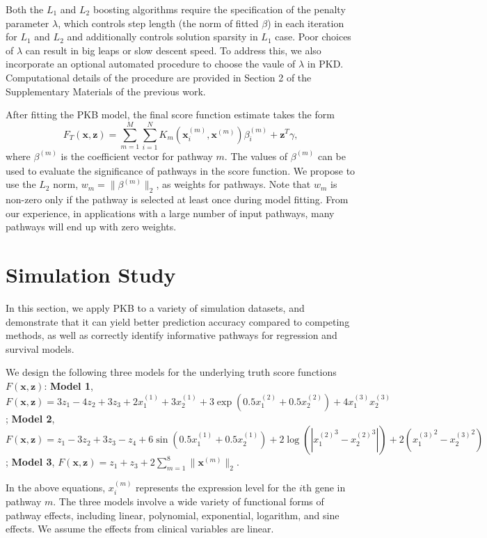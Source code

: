 \documentclass[a4paper,12pt]{article}
\newcommand{\bd}[1]{\mathbf{#1}}
\newcommand{\pathexpr}[3]{{#1}_{#2}^{(#3)}}
\begin{document}
Both the $L_1$ and $L_2$ boosting algorithms require the specification of the penalty parameter $\lambda$, which controls step length (the norm of fitted $\beta$) in each iteration for $L_1$ and $L_2$ and additionally controls solution sparsity in $L_1$ case. Poor choices of $\lambda$ can result in big leaps or slow descent speed. To address this, we also incorporate an optional automated procedure to choose the vaule of $\lambda$ in PKD. Computational details of the procedure are provided in Section 2 of the Supplementary Materials of the previous work.\cite{zeng2019pathway}

After fitting the PKB model, the final score function estimate takes the form
$$F_T(\bd{x}, \bd{z}) = \sum_{m=1}^M \sum_{i=1}^N K_m(\pathexpr{\bd{x}}{i}{m},\pathexpr{\bd{x}}{}{m})\pathexpr{\beta}{i}{m} + \bd{z}^T \gamma,$$
where $\pathexpr{\beta}{}{m}$ is the coefficient vector for pathway $m$. The values of $\pathexpr{\beta}{}{m}$ can be used to evaluate the significance of pathways in the score function. We propose to use the $L_2$ norm, $w_m = \|\beta^{(m)}\|_2$, as weights for pathways. Note that $w_m$ is non-zero only if the pathway is selected at least once during model fitting. From our experience, in applications with a large number of input pathways, many pathways will end up with zero weights.

\section{Simulation Study}\label{simu}
In this section, we apply PKB to a variety of simulation datasets, and demonstrate that it can yield better prediction accuracy compared to competing methods, as well as correctly identify informative pathways for regression and survival models. 

We design the following three models for the underlying truth score functions $F(\bd{x},\bd{z})$: \textbf{Model 1},
	$F(\bd{x},\bd{z}) = 3z_1 - 4z_2 + 3z_3 + 2\pathexpr{x}{1}{1}+3\pathexpr{x}{2}{1}+ 
	3\exp(0.5\pathexpr{x}{1}{2} + 0.5\pathexpr{x}{2}{2}) + 4\pathexpr{x}{1}{3}\pathexpr{x}{2}{3}$; \textbf{Model 2},
	$F(\bd{x},\bd{z}) = z_1 - 3z_2 + 3z_3 - z_4 + 6\sin(0.5\pathexpr{x}{1}{1} + 0.5\pathexpr{x}{2}{1}) + 2\log(|{\pathexpr{x}{1}{2}}^3 - {\pathexpr{x}{2}{2}}^3|) + 2({\pathexpr{x}{1}{3}}^2-{\pathexpr{x}{2}{3}}^2)$; \textbf{Model 3},
	$F(\bd{x},\bd{z}) = z_1 + z_3 + 2\sum_{m=1}^{8} \|\pathexpr{\bd{x}}{}{m}\|_2.$

In the above equations, $\pathexpr{x}{i}{m}$ represents the  expression level for the $i$th gene in pathway $m$. The three models involve a wide variety of functional forms of pathway effects, including linear, polynomial, exponential, logarithm, and sine effects. We assume the effects from clinical variables are linear. 
\end{document}
